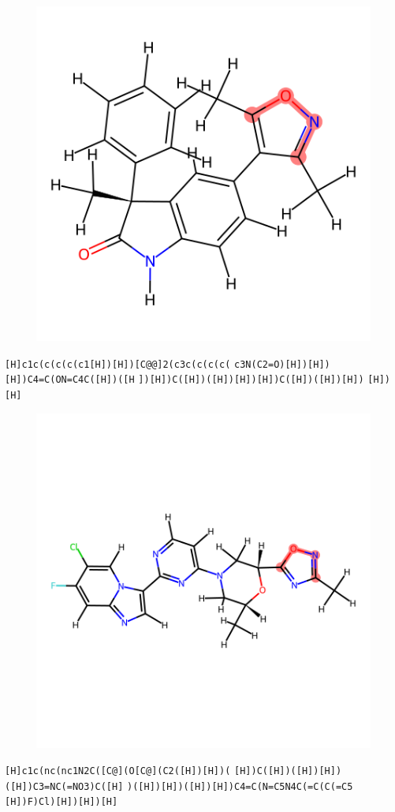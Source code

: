 \documentclass{article}
\begin{document}
\begin{figure}[ht]
\centering
    \includegraphics{mol26.png}
\end{figure}
\verb|[H]c1c(c(c(c(c1[H])[H])[C@@]2(c3c(c(c(c(| \verb|c3N(C2=O)[H])[H])[H])C4=C(ON=C4C([H])([H| \verb|])[H])C([H])([H])[H])[H])C([H])([H])[H])| \verb|[H])[H]|

\begin{figure}[ht]
\centering
    \includegraphics{mol27.png}
\end{figure}
\verb|[H]c1c(nc(nc1N2C([C@](O[C@](C2([H])[H])(| \verb|[H])C([H])([H])[H])([H])C3=NC(=NO3)C([H]| \verb|)([H])[H])([H])[H])C4=C(N=C5N4C(=C(C(=C5| \verb|[H])F)Cl)[H])[H])[H]|
\end{document}
